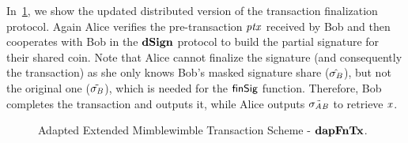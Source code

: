 In~\cref{fig:inst-apt-mw-tx-fin}, we show the updated distributed version of the transaction finalization protocol.
Again Alice verifies the pre-transaction $\mathit{ptx}$ received by Bob and then cooperates with Bob in the $\mathbf{dSign}$ protocol to build the partial signature for their shared coin.
Note that Alice cannot finalize the signature (and consequently the transaction) as she only knows Bob's masked signature share ($\hat{\sigma_{\mathit{B}}}$), but not the original one ($\tilde{\sigma_{\mathit{B}}}$), which is needed for the $\mathsf{finSig}$ function.
Therefore, Bob completes the transaction and outputs it, while Alice outputs $\tilde{\sigma_{\mathit{A}\mathit{B}}}$ to retrieve $\mathit{x}$.

\begin{figure}
    \begin{center}
    \end{center}
    \caption{Adapted Extended Mimblewimble Transaction Scheme - $\mathbf{dapFnTx}$. \label{fig:inst-apt-mw-tx-fin}}
\end{figure}